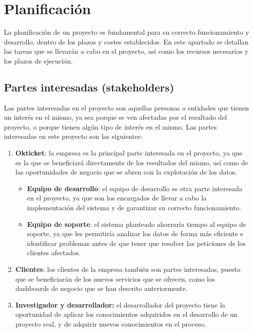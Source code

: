 \chapter{Planificación}\label{chap:planif}
La planificación de un proyecto es fundamental para su correcto funcionamiento y desarrollo,
dentro de los plazos y costes establecidos. En este apartado se detallan las tareas que se
llevarán a cabo en el proyecto, así como los recursos necesarios y los plazos de ejecución.

\section{Partes interesadas (stakeholders)}\label{sec:stakeholders}
Las partes interesadas en el proyecto son aquellas personas o entidades que tienen un interés
en el mismo, ya sea porque se ven afectadas por el resultado del proyecto, o porque tienen
algún tipo de interés en el mismo. Las partes interesadas en este proyecto son las siguientes:

\begin{enumerate}
	\item \textbf{Okticket}: la empresa es la principal parte interesada en el proyecto, ya que
		es la que se beneficiará directamente de los resultados del mismo, así como de las
		oportunidades de negocio que se abren con la explotación de los datos.
		\begin{itemize}
			\item \textbf{Equipo de desarrollo}: el equipo de desarrollo es otra parte interesada en el
				proyecto, ya que son los encargados de llevar a cabo la implementación del sistema y
				de garantizar su correcto funcionamiento.
			\item \textbf{Equipo de soporte}: el sistema planteado ahorraría tiempo al equipo de
				soporte, ya que les permitiría analizar los datos de forma más eficiente e identificar
				problemas antes de que tener que resolver las peticiones de los clientes afectados.
		\end{itemize}
	\item \textbf{Clientes}: los clientes de la empresa también son partes interesadas, puesto
		que se beneficiarán de los nuevos servicios que se ofrecen, como los dashboards de
		negocio que se han descrito anteriormente.
	\item \textbf{Investigador y desarrollador:} el desarrollador del proyecto tiene la oportunidad de
		aplicar los conocimientos adquiridos en el desarrollo de un proyecto real, y de adquirir
		nuevos conocimientos en el proceso.
\end{enumerate}

